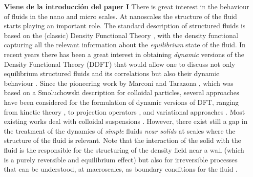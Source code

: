 \documentclass[b5paper,openright,11pt]{book}
\newcommand{\Note}[1]{{\bf \color{red}#1}}    %
\begin{document}
\Note{Viene de la introducción del paper I}
There  is great  interest  in  the behaviour  of  fluids  in the  nano
\cite{Bocquet2010} and micro  \cite{Lauga2005,Bocquet2011} scales.  At
nanoscales  the structure  of the  fluid starts  playing an  important
role.  The standard  description of structured fluids is  based on the
(classic) Density Functional Theory \cite{Evans1979}, with the density
functional   capturing  all   the  relevant   information  about   the
\textit{equilibrium} state  of the fluid.   In recent years  there has
been a  great interest in  obtaining \textit{dynamic} versions  of the
Density Functional Theory  (DDFT) that would allow one  to discuss not
only equilibrium structured fluids and its correlations but also their
dynamic  behaviour \cite{Lowen2003,Evans2016}.   Since the  pioneering
work by Marconi and Tarazona  \cite{Marconi2000}, which was based on a
Smoluchowski description  for colloidal particles,  several approaches
have been considered  for the formulation of dynamic  versions of DFT,
ranging from  kinetic theory  \cite{Guo2006}, to  projection operators
\cite{Espanol2009d},  and variational  approaches \cite{Schmidt2013}.
Most    existing    works     deal    with    colloidal    suspensions
\cite{Goddard2012,Evans2016}. However, there exist  still a gap in the
treatment  of the dynamics of \textit{simple}  fluids \textit{near  solids} at  scales
where  the  structure  of  the  fluid  is  relevant.   Note  that  the
interaction of  the solid with  the fluid  is the responsible  for the
structuring  of the  density  field near  a wall  (which  is a  purely
reversible and equilibrium effect) but also for irreversible processes
that can be understood, at macroscales, as boundary conditions for the
fluid \cite{Bedeaux1976,Bocquet1994}.
\end{document}
